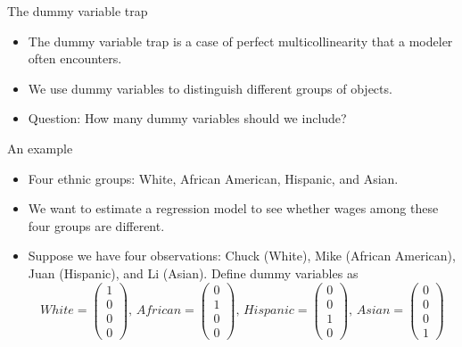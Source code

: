\documentclass[presentation,10pt]{beamer}
\begin{document}
\begin{frame}[label={sec:org72b948b}]{The dummy variable trap}
\begin{itemize}
\item The dummy variable trap is a case of perfect multicollinearity
that a modeler often encounters.
\item We use dummy variables to distinguish different groups of objects.
\item Question: How many dummy variables should we include?
\end{itemize}

\begin{block}{An example}
\begin{itemize}
\item Four ethnic groups: White, African American, Hispanic, and
Asian.
\item We want to estimate a regression model to see whether wages among
these four groups are different.
\item Suppose we have four observations: Chuck (White),
Mike (African American), Juan (Hispanic), and Li (Asian). Define
dummy variables as
\begin{equation*}
White =
\begin{pmatrix}
1 \\
0 \\
0 \\
0
\end{pmatrix},\,
African =
\begin{pmatrix}
0 \\
1 \\
0 \\
0
\end{pmatrix},\,
Hispanic =
\begin{pmatrix}
0 \\
0 \\
1 \\
0
\end{pmatrix},\,
Asian =
\begin{pmatrix}
0 \\
0 \\
0 \\
1
\end{pmatrix}
\end{equation*}
\end{itemize}
\end{block}
\end{frame}
\end{document}
